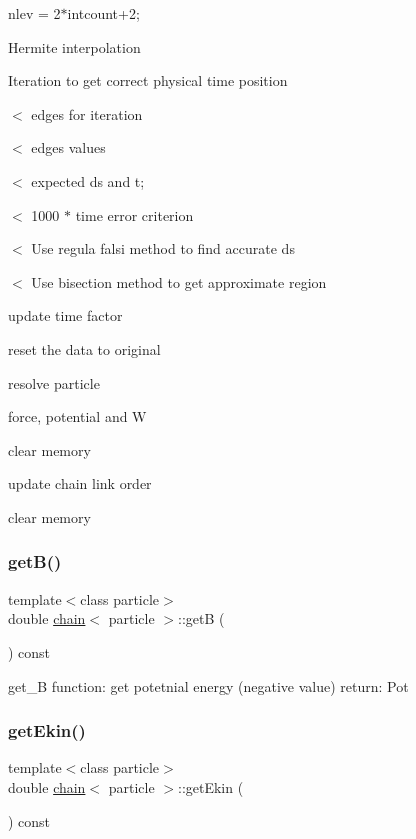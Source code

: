 nlev = 2$\ast$intcount+2;

Hermite interpolation

Iteration to get correct physical time position

$<$ edges for iteration

$<$ edges values

$<$ expected ds and t;

$<$ 1000 $\ast$ time error criterion

$<$ Use regula falsi method to find accurate ds

$<$ Use bisection method to get approximate region

update time factor

reset the data to original

resolve particle

force, potential and W

clear memory

update chain link order

clear memory \hypertarget{classchain_a0dee1cb1d986110c6f05e71e25b020d0}{}\label{classchain_a0dee1cb1d986110c6f05e71e25b020d0} 
\subsubsection{\texorpdfstring{get\+B()}{getB()}}
{\footnotesize\ttfamily template$<$class particle$>$ \\
double \hyperlink{classchain}{chain}$<$ particle $>$\+::getB (\begin{DoxyParamCaption}{ }\end{DoxyParamCaption}) const\hspace{0.3cm}{\ttfamily [inline]}}



get\+\_\+B function\+: get potetnial energy (negative value) return\+: Pot 

\hypertarget{classchain_aa230b214a266ce94c564c40a0c0c497f}{}\label{classchain_aa230b214a266ce94c564c40a0c0c497f} 
\subsubsection{\texorpdfstring{get\+Ekin()}{getEkin()}}
{\footnotesize\ttfamily template$<$class particle$>$ \\
double \hyperlink{classchain}{chain}$<$ particle $>$\+::get\+Ekin (\begin{DoxyParamCaption}{ }\end{DoxyParamCaption}) const\hspace{0.3cm}{\ttfamily [inline]}}



